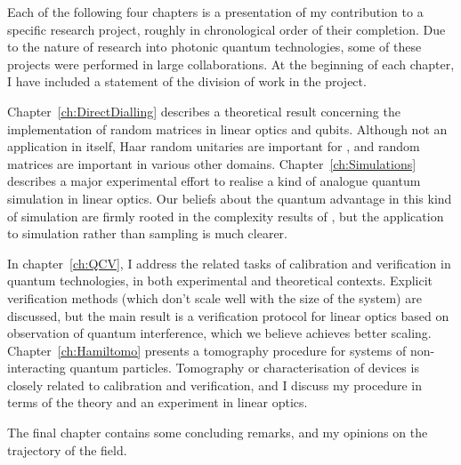 Each of the following four chapters is a presentation of my contribution to a
specific research project, roughly in chronological order of their completion.
Due to the nature of research into photonic quantum technologies, some of these
projects were performed in large collaborations. At the beginning of each
chapter, I have included a statement of the division of work in the project.

Chapter~\ref{ch:DirectDialling} describes a theoretical result concerning the
implementation of random matrices in linear optics and qubits. Although not an
application in itself, Haar random unitaries are important for \bosonsampling{},
and random matrices are important in various other domains.
Chapter~\ref{ch:Simulations} describes a major experimental effort to realise a
kind of analogue quantum simulation in linear optics. Our beliefs about the
quantum advantage in this kind of simulation are firmly rooted in the
complexity results of \bosonsampling{}, but the application to simulation rather
than sampling is much clearer.

In chapter~\ref{ch:QCV}, I address the related tasks of calibration and
verification in quantum technologies, in both experimental and theoretical
contexts. Explicit verification methods (which don't scale well with the size of
the system) are discussed, but the main result is a verification protocol for
linear optics based on observation of quantum interference, which we believe
achieves better scaling. Chapter~\ref{ch:Hamiltomo} presents a tomography
procedure for systems of non-interacting quantum particles. Tomography or
characterisation of devices is closely related to calibration and verification,
and I discuss my procedure in terms of the theory and an experiment in linear
optics.

The final chapter contains some concluding remarks, and my opinions on the
trajectory of the field.
